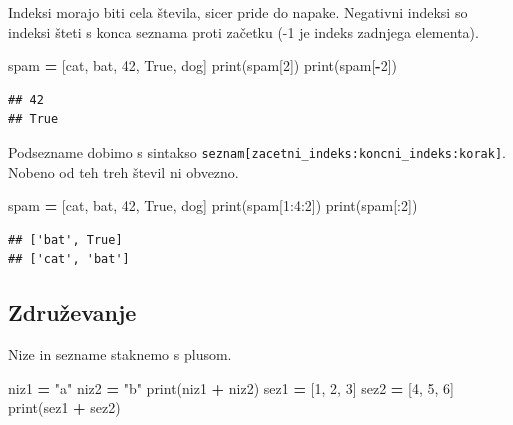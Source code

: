 \documentclass[
]{book}
\newenvironment{Shaded}{\begin{snugshade}}{\end{snugshade}}
\newcommand{\BuiltInTok}[1]{#1}
\newcommand{\DecValTok}[1]{\textcolor[rgb]{0.00,0.00,0.81}{#1}}
\newcommand{\NormalTok}[1]{#1}
\newcommand{\OperatorTok}[1]{\textcolor[rgb]{0.81,0.36,0.00}{\textbf{#1}}}
\newcommand{\StringTok}[1]{\textcolor[rgb]{0.31,0.60,0.02}{#1}}
\newcommand{\VariableTok}[1]{\textcolor[rgb]{0.00,0.00,0.00}{#1}}
\begin{document}
Indeksi morajo biti cela števila, sicer pride do napake. Negativni indeksi so
indeksi šteti s konca seznama proti začetku (-1 je indeks zadnjega elementa).

\begin{Shaded}
\begin{Highlighting}[]
\NormalTok{spam }\OperatorTok{=}\NormalTok{ [}\StringTok{\textquotesingle{}cat\textquotesingle{}}\NormalTok{, }\StringTok{\textquotesingle{}bat\textquotesingle{}}\NormalTok{, }\DecValTok{42}\NormalTok{, }\VariableTok{True}\NormalTok{, }\StringTok{\textquotesingle{}dog\textquotesingle{}}\NormalTok{]}
\BuiltInTok{print}\NormalTok{(spam[}\DecValTok{2}\NormalTok{])}
\BuiltInTok{print}\NormalTok{(spam[}\OperatorTok{{-}}\DecValTok{2}\NormalTok{])}
\end{Highlighting}
\end{Shaded}

\begin{verbatim}
## 42
## True
\end{verbatim}

Podsezname dobimo s sintakso \texttt{seznam{[}zacetni\_indeks:koncni\_indeks:korak{]}}. Nobeno
od teh treh števil ni obvezno.

\begin{Shaded}
\begin{Highlighting}[]
\NormalTok{spam }\OperatorTok{=}\NormalTok{ [}\StringTok{\textquotesingle{}cat\textquotesingle{}}\NormalTok{, }\StringTok{\textquotesingle{}bat\textquotesingle{}}\NormalTok{, }\DecValTok{42}\NormalTok{, }\VariableTok{True}\NormalTok{, }\StringTok{\textquotesingle{}dog\textquotesingle{}}\NormalTok{]}
\BuiltInTok{print}\NormalTok{(spam[}\DecValTok{1}\NormalTok{:}\DecValTok{4}\NormalTok{:}\DecValTok{2}\NormalTok{])}
\BuiltInTok{print}\NormalTok{(spam[:}\DecValTok{2}\NormalTok{])}
\end{Highlighting}
\end{Shaded}

\begin{verbatim}
## ['bat', True]
## ['cat', 'bat']
\end{verbatim}

\hypertarget{zdruux17eevanje}{%
\subsection{Združevanje}\label{zdruux17eevanje}}

Nize in sezname staknemo s plusom.

\begin{Shaded}
\begin{Highlighting}[]
\NormalTok{niz1 }\OperatorTok{=} \StringTok{"a"}
\NormalTok{niz2 }\OperatorTok{=} \StringTok{"b"}
\BuiltInTok{print}\NormalTok{(niz1 }\OperatorTok{+}\NormalTok{ niz2)}
\NormalTok{sez1 }\OperatorTok{=}\NormalTok{ [}\DecValTok{1}\NormalTok{, }\DecValTok{2}\NormalTok{, }\DecValTok{3}\NormalTok{]}
\NormalTok{sez2 }\OperatorTok{=}\NormalTok{ [}\DecValTok{4}\NormalTok{, }\DecValTok{5}\NormalTok{, }\DecValTok{6}\NormalTok{]}
\BuiltInTok{print}\NormalTok{(sez1 }\OperatorTok{+}\NormalTok{ sez2)}
\end{Highlighting}
\end{Shaded}
\end{document}
